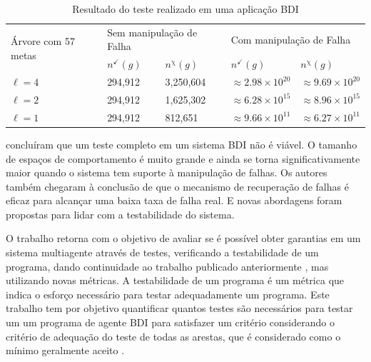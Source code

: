 \begin{table}[ht]
\centering
\caption{Resultado do teste realizado em uma aplicação BDI \cite{winikoff2014testability}}
\label{tab:result_ontestability}
\begin{tabular}{@{}lllll@{}}
\toprule
\multirow{2}{*}{Árvore com 57 metas} & \multicolumn{2}{l}{Sem manipulação de Falha} & \multicolumn{2}{l}{Com manipulação de Falha}                  \\
                                        & $n^{\checkmark}(g)$     & $n^{\upchi}(g)$    & $n^{\checkmark}(g)$           & $n^{\upchi}(g)$               \\ \midrule
$\ell = 4$                              & 294,912                 & 3,250,604          & $\approx 2.98 \times 10^{20}$ & $\approx 9.69 \times 10^{20}$ \\
$\ell = 2$                              & 294,912                 & 1,625,302          & $\approx 6.28 \times 10^{15}$ & $\approx 8.96 \times 10^{15}$ \\
$\ell = 1$                              & 294,912                 & 812,651            & $\approx 9.66 \times 10^{11}$ & $\approx 6.27 \times 10^{11}$ \\ \bottomrule
\end{tabular}
\end{table}

\cite{winikoff2014testability} concluíram que um teste completo em um sistema BDI não é viável. O tamanho de espaços de comportamento é muito grande e ainda se torna significativamente maior quando o sistema tem suporte à manipulação de falhas. Os autores também chegaram à conclusão de que o mecanismo de recuperação de falhas é eficaz para alcançar uma baixa taxa de falha real. E novas abordagens foram propostas para lidar com a testabilidade do sistema.


O trabalho \cite{winikoff2017bdi} retorna com o objetivo de avaliar se é possível obter garantias em um sistema multiagente através de testes, verificando a testabilidade de um programa, dando continuidade ao trabalho publicado anteriormente \cite{winikoff2014testability}, mas utilizando novas métricas. A testabilidade de um programa é um métrica que indica o esforço necessário para testar adequadamente um programa. Este trabalho tem por objetivo quantificar quantos testes são necessários para testar um um programa de agente BDI para satisfazer um critério considerando o critério de adequação do teste de todas as arestas, que é considerado como o mínimo geralmente aceito \cite{jorgensen2016software}. 

